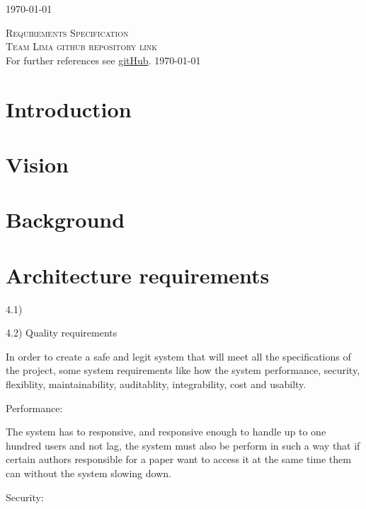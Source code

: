 \documentclass[a4paper,12pt]{report}
\begin{document}
\begin{titlepage}
\begin{center}
{\large \today}
\end{center}
\end{titlepage}
\footnotesize
\normalsize

\renewcommand{\thesection}{\arabic{section}}
\newpage
\begin{center}
\textsc{\LARGE Requirements Specification}\\[1.5cm]
\textsc{\Large Team Lima github repository link}\\[0.5cm]
For further references see \href{https://https://github.com/slugger7/team-lima}{gitHub}.
\today
\end{center}


\newpage
\section{Introduction}

\newpage
\section{Vision}

\newpage
\section{Background}

\newpage
\section{Architecture requirements}
4.1)

4.2) Quality requirements


In order to create a safe and legit system that will meet all the specifications of the project, some system requirements like how the system performance, security, flexiblity, maintainability, auditablity, integrability, cost and usabilty.

Performance: 

The system has to responsive, and responsive enough to handle up to one hundred users and not lag, the system must also be perform in such a way that if certain authors responsible for a paper want to access it at the same time them can without the system slowing down.

Security: 
\end{document}

